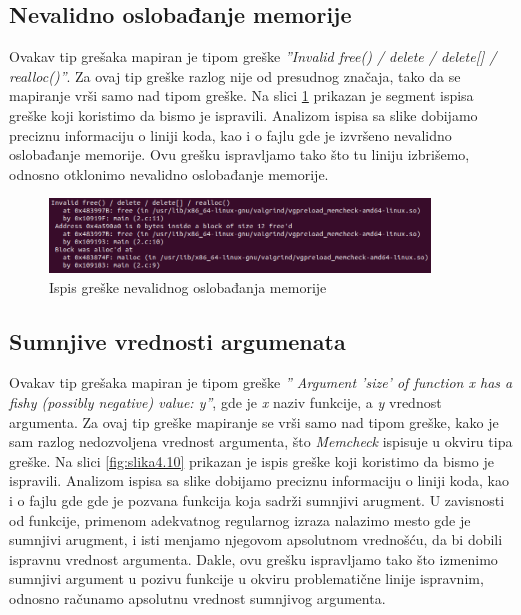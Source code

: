 \documentclass[12pt,oneside]{memoir}
\theoremstyle{plain}
\theoremstyle{definition}
\begin{document}
\subsection{Nevalidno oslobađanje memorije}
Ovakav tip grešaka mapiran je tipom greške \textit{''Invalid free() / delete / delete[] / realloc()''}. Za ovaj tip greške razlog nije od presudnog značaja, tako da se mapiranje vrši samo nad tipom greške. Na slici \ref{fig:slika4.9} prikazan je segment ispisa greške koji koristimo da bismo je ispravili. Analizom ispisa sa slike dobijamo preciznu informaciju o liniji koda, kao i o fajlu gde je izvršeno nevalidno oslobađanje memorije. Ovu grešku ispravljamo tako što tu liniju izbrišemo, odnosno otklonimo nevalidno oslobađanje memorije. 

\begin{figure}[!ht]
  \centering
  \includegraphics[width=0.9\textwidth]{InvalidFreeErrorPartOfResume.png}
  \caption{Ispis greške nevalidnog oslobađanja memorije}
  \label{fig:slika4.9}
\end{figure} 

\subsection{Sumnjive vrednosti argumenata}
Ovakav tip grešaka mapiran je tipom greške \textit{'' Argument 'size' of function x has a fishy (possibly negative) value: y''}, gde je \textit{x} naziv funkcije, a \textit{y} vrednost argumenta. Za ovaj tip greške mapiranje se vrši samo nad tipom greške, kako je sam razlog nedozvoljena vrednost argumenta, što \textit{Memcheck} ispisuje u okviru tipa greške. Na slici \ref{fig:slika4.10} prikazan je ispis greške koji koristimo da bismo je ispravili. Analizom ispisa sa slike dobijamo preciznu informaciju o liniji koda, kao i o fajlu gde gde je pozvana funkcija koja sadrži sumnjivi arugment. U zavisnosti od funkcije, primenom adekvatnog regularnog izraza nalazimo mesto gde je sumnjivi arugment, i isti menjamo njegovom apsolutnom vrednošću, da bi dobili ispravnu vrednost argumenta. Dakle, ovu grešku ispravljamo tako što izmenimo sumnjivi argument u pozivu funkcije u okviru problematične linije ispravnim, odnosno računamo apsolutnu vrednost sumnjivog argumenta. 
\end{document}
